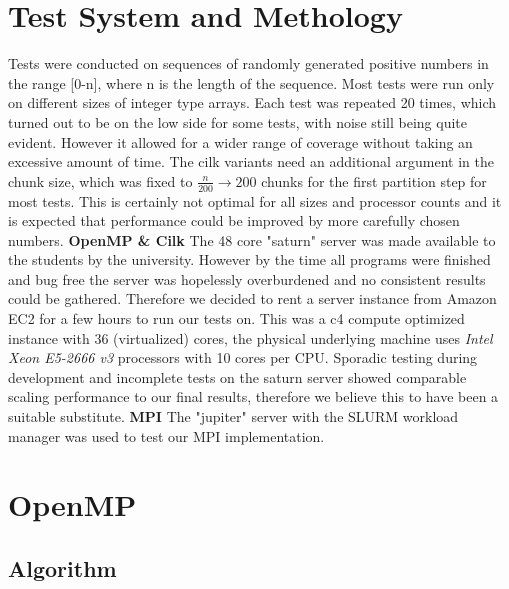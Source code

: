 \documentclass[12pt,a4paper]{article}
\begin{document}
\section{Test System and Methology}
Tests were conducted on sequences of randomly generated positive numbers in the range [0-n], where n is the length of the sequence. Most tests were run only on different sizes of integer type arrays. Each test was repeated 20 times, which turned out to be on the low side for some tests, with noise still being quite evident. However it allowed for a wider range of coverage without taking an excessive amount of time. The cilk variants need an additional argument in the chunk size, which was fixed to $\frac{n}{200}\rightarrow 200$ chunks for the first partition step for most tests. This is certainly not optimal for all sizes and processor counts and it is expected that performance could be improved by more carefully chosen numbers.\newline\newline
\textbf{OpenMP \& Cilk}\newline
The 48 core "saturn" server was made available to the students by the university. However by the time all programs were finished and bug free the server was hopelessly overburdened and no consistent results could be gathered. Therefore we decided to rent a server instance from Amazon EC2 for a few hours to run our tests on. This was a c4 compute optimized instance with 36 (virtualized) cores, the physical underlying machine uses \emph{Intel Xeon E5-2666 v3} processors with 10 cores per CPU. Sporadic testing during development and incomplete tests on the saturn server showed comparable scaling performance to our final results, therefore we believe this to have been a suitable substitute.
\newline\newline
\textbf{MPI}\newline
The "jupiter" server with the SLURM workload manager was used to test our MPI implementation. 

\section{OpenMP}

\subsection{Algorithm}
\end{document}
